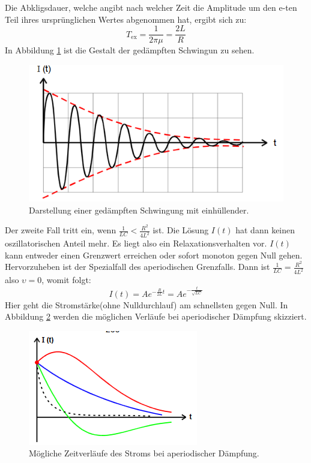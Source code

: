 Die Abkligsdauer, welche angibt nach welcher Zeit die Amplitude um den e-ten Teil ihres ursprünglichen Wertes abgenommen hat, ergibt sich zu:
\begin{equation}
  T_\text{ex}=\frac{1}{2 \pi \mu}=\frac{2L}{R}
\end{equation}
In Abbildung \ref{fig:daempf} ist die Gestalt der gedämpften Schwingun zu sehen.
\begin{figure}[H]
    \centering
    \caption{Darstellung einer gedämpften Schwingung mit einhüllender.\cite{v354}}
    \label{fig:daempf}
    \includegraphics[width=\textwidth-20em]{content/daempfung.png}
\end{figure}
\noindent
Der zweite Fall tritt ein, wenn $\frac{1}{LC}<\frac{R^2}{4L^2}$ ist.
Die Lösung $I(t)$ hat dann keinen oszillatorischen Anteil mehr.
Es liegt also ein Relaxationsverhalten vor.
$I(t)$ kann entweder einen Grenzwert erreichen oder sofort monoton gegen Null gehen.
Hervorzuheben ist der Spezialfall des aperiodischen Grenzfalls.
Dann ist $\frac{1}{LC}=\frac{R^2}{4L^2}$ also $\upsilon=0$, womit folgt:
\begin{equation}
  I(t)=Ae^{-\frac{R}{2L}t}=Ae^{-\frac{t}{\sqrt{LC}}}
\end{equation}
Hier geht die Stromstärke(ohne Nulldurchlauf) am schnellsten gegen Null.
In Abbildung \ref{fig:ap} werden die möglichen Verläufe bei aperiodischer Dämpfung skizziert.
\begin{figure}[H]
    \centering
    \caption{Mögliche Zeitverläufe des Stroms bei aperiodischer Dämpfung.\cite{v354}}
    \label{fig:ap}
    \includegraphics[width=\textwidth-20em]{content/apgrenz.png}
\end{figure}
\noindent
